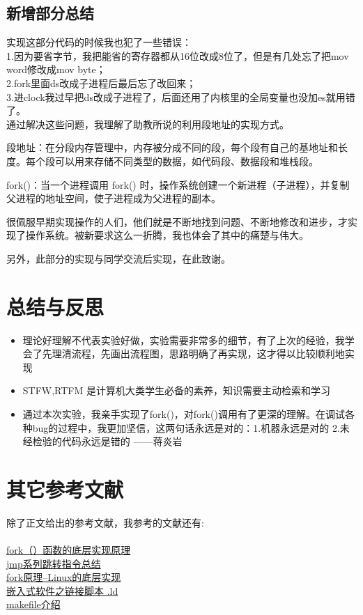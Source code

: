 \documentclass{LabReport}
\begin{document}
	\subsection{ 新增部分总结}
	实现这部分代码的时候我也犯了一些错误：\\
	1.因为要省字节，我把能省的寄存器都从16位改成8位了，但是有几处忘了把mov word修改成mov byte；\\
	2.fork里面ds改成子进程后最后忘了改回来；\\
	3.进clock我过早把ds改成子进程了，后面还用了内核里的全局变量也没加es就用错了。\\
	通过解决这些问题，我理解了助教所说的利用段地址的实现方式。\par
	\hspace{0em}段地址：在分段内存管理中，内存被分成不同的段，每个段有自己的基地址和长度。每个段可以用来存储不同类型的数据，如代码段、数据段和堆栈段。\par
	\hspace{0em}fork()：当一个进程调用 fork() 时，操作系统创建一个新进程（子进程），并复制父进程的地址空间，使子进程成为父进程的副本。\par
	\hspace{0em}很佩服早期实现操作的人们，他们就是不断地找到问题、不断地修改和进步，才实现了操作系统。被新要求这么一折腾，我也体会了其中的痛楚与伟大。\par
	\hspace{0em}另外，此部分的实现与同学交流后实现，在此致谢。
	
	
	
	\section{总结与反思}
	\begin{itemize}
		\item 理论好理解不代表实验好做，实验需要非常多的细节，有了上次的经验，我学会了先理清流程，先画出流程图，思路明确了再实现，这才得以比较顺利地实现
		\item STFW,RTFM 是计算机大类学生必备的素养，知识需要主动检索和学习
		\item 通过本次实验，我亲手实现了fork()，对fork()调用有了更深的理解。在调试各种bug的过程中，我更加坚信，这两句话永远是对的：1.机器永远是对的 2.未经检验的代码永远是错的 ——蒋炎岩
	\end{itemize}

	\section{其它参考文献}
	除了正文给出的参考文献，我参考的文献还有:\\\\
	\href{https://blog.csdn.net/qq_42230338/article/details/96485400}{fork（）函数的底层实现原理}\\
	\href{https://www.cnblogs.com/HsinTsao/p/6512715.html}{jmp系列跳转指令总结}\\
	\href{https://blog.csdn.net/darker0019527/article/details/103374186}{fork原理--Linux的底层实现}\\
	\href{https://zhuanlan.zhihu.com/p/656259964}{嵌入式软件之链接脚本 .ld}\\
	\href{https://blog.csdn.net/qq_53004789/article/details/131354767}{makefile介绍}\\
	
\end{document}
